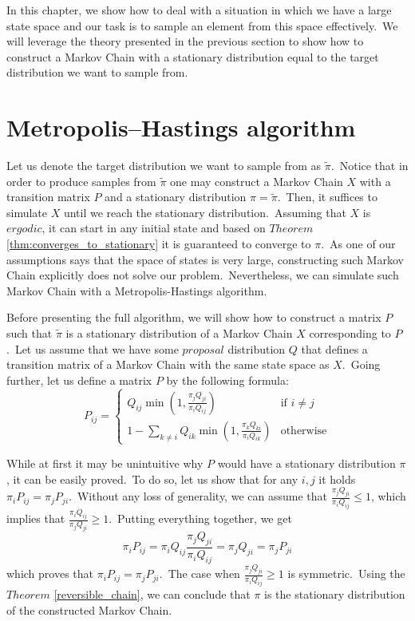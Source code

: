 \documentclass[a4paper, 11pt, onecolumn, openany, titlepage]{report}
\theoremstyle{default_theorem_style}\newtheorem{theorem}{Theorem}
\theoremstyle{default_theorem_style}\newtheorem{definition}{Definition}
\begin{document}
In this chapter, we show how to deal with a situation in which we have a large state space and our task is to sample
an element from this space effectively.\ We will leverage the theory presented in the previous section to show how
to construct a Markov Chain with a stationary distribution equal to the target distribution we want to sample from.

\section{Metropolis–Hastings algorithm}

Let us denote the target distribution we want to sample from as $\tilde{\pi}$.\ Notice that in order to produce samples
from $\tilde{\pi}$ one may construct a Markov Chain $X$ with a transition matrix $P$ and a stationary distribution
$\pi = \tilde{\pi}$.\ Then, it suffices to simulate $X$ until we reach the stationary distribution.\ Assuming
that $X$ is $ergodic$, it can start in any initial state and based on $Theorem$ \ref{thm:converges_to_stationary} it
is guaranteed to converge to $\pi$.\ As one of our assumptions says that the space of states is very large,
constructing such Markov Chain explicitly does not solve our problem.\ Nevertheless, we can simulate such Markov Chain
with a Metropolis-Hastings algorithm.\newline

Before presenting the full algorithm, we will show how to construct a matrix $P$ such that $\tilde{\pi}$ is a
stationary distribution of a Markov Chain $X$ corresponding to $P$.\ Let us assume that we have some $proposal$
distribution $Q$ that defines a transition matrix of a Markov Chain with the same state space as $X$.\ Going further,
let us define a matrix $P$ by the following formula:\newline
$$
P_{ij} =
\begin{cases}
  Q_{ij}\min{(1, \frac{\pi_j Q_{ji}}{\pi_i Q_{ij}})} &\text{if $i \ne j$}\\
  1 - \sum\limits_{k \ne i}Q_{ik} \min{(1, \frac{\pi_k Q_{ki}}{\pi_i Q_{ik}})} &\text{otherwise}
\end{cases}
$$

While at first it may be unintuitive why $P$ would have a stationary distribution $\pi$, it can be easily
proved.\ To do so, let us show that for any $i, j$ it holds $\pi_i P_{ij} = \pi_j P_{ji}$.\ Without any loss of
generality, we can assume that $\frac{\pi_j Q_{ji}}{\pi_i Q_{ij}} \leq 1$, which implies that
$\frac{\pi_i Q_{ij}}{\pi_j Q_{ji}} \geq 1$.\ Putting everything together, we get
$$
\pi_i P_{ij} = \pi_i Q_{ij} \frac{\pi_j Q_{ji}}{\pi_i Q_{ij}} = \pi_j Q_{ji} = \pi_j P_{ji}
$$
which proves that $\pi_i P_{ij} = \pi_j P_{ji}$.\ The case when $\frac{\pi_j Q_{ji}}{\pi_i Q_{ij}} \geq 1$ is
symmetric.\ Using the $Theorem$ \ref{reversible_chain}, we can conclude that $\pi$ is the stationary distribution of
the constructed Markov Chain.\newline
\end{document}
